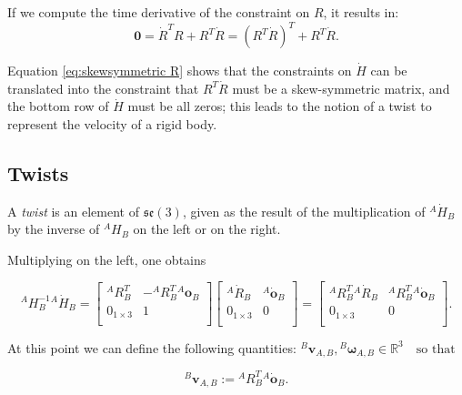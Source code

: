    If we compute the time derivative of the constraint on $ {R}$, it results in:
    \begin{equation}
    \mathbf{0} = \dot{ {R}}^{T} {R} +  {R}^{T}\dot{ {R}} = ( {R}^{T}\dot{ {R}})^{T} +  {R}^{T}\dot{ {R}}.
    \label{eq:skewsymmetric R}
    \end{equation}

    Equation \eqref{eq:skewsymmetric R} shows that the constraints on $\dot{ {H}}$ can be translated into the constraint that $ {R}^{T}\dot{ {R}}$ must be a skew-symmetric matrix, and the bottom row of $\dot{ {H}}$ must be all zeros; this leads  to the notion of  a twist to represent the velocity of a rigid body.

    \subsection{Twists}
    \label{subsec: Twists}
    A \textit{twist} is an element of $\mathfrak{se}(3)$, given as the result of the multiplication of ${}^{A}\dot{ {H}}_B$ by the inverse of ${}^{A} {H}_B$ on the left or on the right.

    Multiplying on the left, one obtains

    \begin{equation}
    {}^{A} {H}^{-1}_B{}^{A}\dot{ {H}}_B = \begin{bmatrix}
    {}^{A} {R}^{T}_B & -{}^{A} {R}^{T}_B{}^{A} \mathbf{o}_B \\
     {0}_{1 \times 3} & 1 \\
    \end{bmatrix} \begin{bmatrix}
    {}^{A}\dot{ {R}}_B & {}^{A}\dot{ \mathbf{o}}_B \\
     {0}_{1 \times 3} & 0 \\
    \end{bmatrix} = \begin{bmatrix}
    {}^{A} {R}^{T}_B{}^{A}\dot{ {R}}_B & {}^{A} {R}^{T}_B{}^{A}\dot{ \mathbf{o}}_B \\
     {0}_{1 \times 3} & 0 \\
    \end{bmatrix}.
    \label{eq: twist derivation}
    \end{equation}
    
    At this point we can define the following quantities: ${}^{B}\bm{v}_{A,B}, {}^{B}\bm{\omega}_{A,B} \in \mathbb{R}^3 \quad \text{so that}$

    \begin{equation}
    {}^{B}\bm{v}_{A,B} := {}^{A} {R}^{T}_B{}^{A}\dot{ \mathbf{o}}_B.
    \end{equation}

